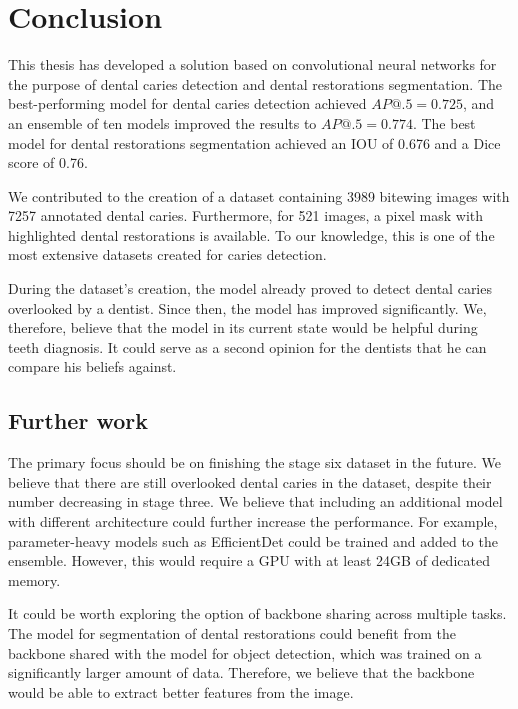 \chapter{Conclusion}

This thesis has developed a solution based on convolutional neural networks for the purpose of dental caries detection and dental restorations segmentation. The best-performing model for dental caries detection achieved $AP@.5=0.725$, and an ensemble of ten models improved the results to $AP@.5=0.774$. The best model for dental restorations segmentation achieved an IOU of 0.676 and a Dice score of 0.76.

\medskip
We contributed to the creation of a dataset containing 3989 bitewing images with 7257 annotated dental caries. Furthermore, for 521 images, a pixel mask with highlighted dental restorations is available. To our knowledge, this is one of the most extensive datasets created for caries detection.

\medskip
During the dataset's creation, the model already proved to detect dental caries overlooked by a dentist. Since then, the model has improved significantly. We, therefore, believe that the model in its current state would be helpful during teeth diagnosis. It could serve as a second opinion for the dentists that he can compare his beliefs against.

\section*{Further work}
The primary focus should be on finishing the stage six dataset in the future. We believe that there are still overlooked dental caries in the dataset, despite their number decreasing in stage three.
\medskip
We believe that including an additional model with different architecture could further increase the performance. For example, parameter-heavy models such as EfficientDet could be trained and added to the ensemble. However, this would require a GPU with at least 24GB of dedicated memory.

\medskip
It could be worth exploring the option of backbone sharing across multiple tasks. The model for segmentation of dental restorations could benefit from the backbone shared with the model for object detection, which was trained on a significantly larger amount of data. Therefore, we believe that the backbone would be able to extract better features from the image.



